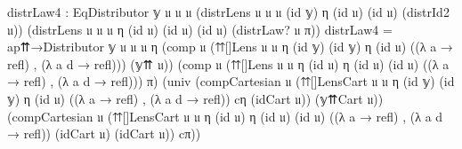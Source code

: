 \documentclass[
  11pt,
  oneside,
  article]{memoir}
\newenvironment{Shaded}{}{}
\newcommand{\NormalTok}[1]{#1}
\newcommand{\OtherTok}[1]{\textcolor[rgb]{0.00,0.44,0.13}{#1}}
\theoremstyle{definition}
\theoremstyle{plain}
\newcommand{\0}{\textsf{0}}
\newcommand{\1}{\tn{\textsf{1}}}
\begin{document}
\begin{Shaded}
\begin{Highlighting}[]
\NormalTok{    distrLaw4 }\OtherTok{:}\NormalTok{ EqDistributor 𝕪 𝔲 𝔲 𝔲}
                    \OtherTok{(}\NormalTok{distrLens 𝔲 𝔲 𝔲 }\OtherTok{(}\NormalTok{id 𝕪}\OtherTok{)}\NormalTok{ η }\OtherTok{(}\NormalTok{id 𝔲}\OtherTok{)} \OtherTok{(}\NormalTok{id 𝔲}\OtherTok{)} 
                               \OtherTok{(}\NormalTok{distrId2 𝔲}\OtherTok{))} 
                    \OtherTok{(}\NormalTok{distrLens 𝔲 𝔲 𝔲 η }\OtherTok{(}\NormalTok{id 𝔲}\OtherTok{)} \OtherTok{(}\NormalTok{id 𝔲}\OtherTok{)} \OtherTok{(}\NormalTok{id 𝔲}\OtherTok{)} 
                               \OtherTok{(}\NormalTok{distrLaw? 𝔲 π}\OtherTok{))}
\NormalTok{    distrLaw4 }\OtherTok{=}
\NormalTok{        ap⇈→Distributor 𝕪 𝔲 𝔲 𝔲 η }
            \OtherTok{(}\NormalTok{comp 𝔲 }\OtherTok{(}\NormalTok{⇈[]Lens 𝔲 𝔲 η }\OtherTok{(}\NormalTok{id 𝕪}\OtherTok{)} \OtherTok{(}\NormalTok{id 𝕪}\OtherTok{)}\NormalTok{ η }\OtherTok{(}\NormalTok{id 𝔲}\OtherTok{)} 
                             \OtherTok{((λ}\NormalTok{ a }\OtherTok{→}\NormalTok{ refl}\OtherTok{)}\NormalTok{ , }\OtherTok{(λ}\NormalTok{ a d }\OtherTok{→}\NormalTok{ refl}\OtherTok{)))} 
                    \OtherTok{(}\NormalTok{𝕪⇈ 𝔲}\OtherTok{))}
            \OtherTok{(}\NormalTok{comp 𝔲 }\OtherTok{(}\NormalTok{⇈[]Lens 𝔲 𝔲 η }\OtherTok{(}\NormalTok{id 𝔲}\OtherTok{)}\NormalTok{ η }\OtherTok{(}\NormalTok{id 𝔲}\OtherTok{)} \OtherTok{(}\NormalTok{id 𝔲}\OtherTok{)}
                             \OtherTok{((λ}\NormalTok{ a }\OtherTok{→}\NormalTok{ refl}\OtherTok{)}\NormalTok{ , }\OtherTok{(λ}\NormalTok{ a d }\OtherTok{→}\NormalTok{ refl}\OtherTok{)))} 
\NormalTok{                    π}\OtherTok{)} 
            \OtherTok{(}\NormalTok{univ }\OtherTok{(}\NormalTok{compCartesian 𝔲 }
                    \OtherTok{(}\NormalTok{⇈[]LensCart 𝔲 𝔲 η }\OtherTok{(}\NormalTok{id 𝕪}\OtherTok{)} \OtherTok{(}\NormalTok{id 𝕪}\OtherTok{)}\NormalTok{ η }\OtherTok{(}\NormalTok{id 𝔲}\OtherTok{)} 
                                 \OtherTok{((λ}\NormalTok{ a }\OtherTok{→}\NormalTok{ refl}\OtherTok{)}\NormalTok{ , }\OtherTok{(λ}\NormalTok{ a d }\OtherTok{→}\NormalTok{ refl}\OtherTok{))} 
\NormalTok{                                 cη }\OtherTok{(}\NormalTok{idCart 𝔲}\OtherTok{))} 
                    \OtherTok{(}\NormalTok{𝕪⇈Cart 𝔲}\OtherTok{))} 
                  \OtherTok{(}\NormalTok{compCartesian 𝔲 }
                    \OtherTok{(}\NormalTok{⇈[]LensCart 𝔲 𝔲 η }\OtherTok{(}\NormalTok{id 𝔲}\OtherTok{)}\NormalTok{ η }\OtherTok{(}\NormalTok{id 𝔲}\OtherTok{)} \OtherTok{(}\NormalTok{id 𝔲}\OtherTok{)} 
                                 \OtherTok{((λ}\NormalTok{ a }\OtherTok{→}\NormalTok{ refl}\OtherTok{)}\NormalTok{ , }\OtherTok{(λ}\NormalTok{ a d }\OtherTok{→}\NormalTok{ refl}\OtherTok{))} 
                                 \OtherTok{(}\NormalTok{idCart 𝔲}\OtherTok{)} \OtherTok{(}\NormalTok{idCart 𝔲}\OtherTok{))} 
\NormalTok{                    cπ}\OtherTok{))}
\end{Highlighting}
\end{Shaded}
\end{document}
